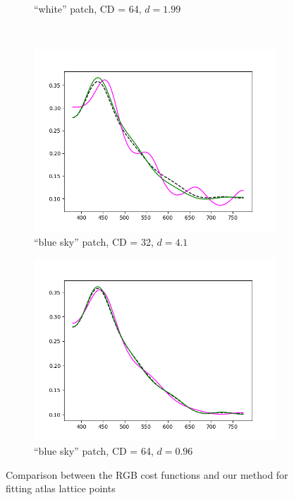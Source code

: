 \begin{figure}[t]
\begin{subfigure}[t]{0.45\textwidth}
		\caption{``white'' patch, CD = 64, $d = 1.99$}
		\label{fig:resultsCostFunctions_white64}
	\end{subfigure} \hspace{0.1em}
	\vspace{0.5em}\\
	\begin{subfigure}[t]{0.45\textwidth}
		\includegraphics[width=\linewidth]{img/results_costFunctions_bs_cd32.png}
		\caption{``blue sky'' patch, CD = 32, $d = 4.1$}
		\label{fig:resultsCostFunctions_bs32}
	\end{subfigure} \hspace{0.1em}
	\begin{subfigure}[t]{0.45\textwidth}
		\includegraphics[width=\linewidth]{img/results_costFunctions_bs_cd64.png}
		\caption{``blue sky'' patch, CD = 64, $d = 0.96$}
		\label{fig:resultsCostFunctions_bs64}
	\end{subfigure}
	\caption{Comparison between the RGB cost functions and our method for fitting atlas lattice points}
	\label{fig:resultsCostFunctions}
\end{figure}

